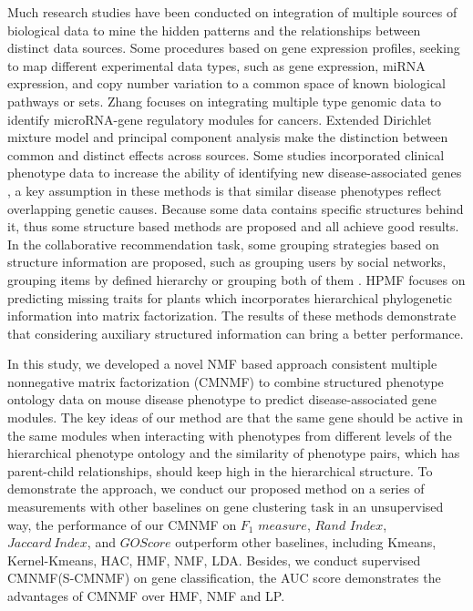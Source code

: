 \documentclass{bmcart}
\begin{document}
Much research studies have been conducted on integration of multiple sources of biological data to mine the hidden patterns and the relationships between distinct data sources. Some procedures based on gene expression profiles, seeking to map different experimental data types, such as gene expression, miRNA expression, and copy number variation to a common space of known biological pathways or sets\cite{Khatri2012,Mitrea2013}. Zhang\cite{Zhang2011} focuses on integrating multiple type genomic data to identify microRNA-gene regulatory modules for cancers. Extended Dirichlet mixture model\cite{Lock2013} and principal component analysis\cite{Lock2013a} make the distinction between common and distinct effects across sources. Some studies incorporated clinical phenotype data to increase the ability of identifying new disease-associated genes\cite{Hwang2012,Lage2007,Li2010,Vanunu2010,Wu2008a,Wu2008b}
, a key assumption in these methods is that similar disease phenotypes reflect overlapping genetic causes\cite{Houle2010}.
 Because some data contains specific structures behind it, thus some structure based methods are proposed and all achieve good results. In the collaborative recommendation task, some grouping strategies based on structure information are proposed, such as grouping users by social networks, grouping items by defined hierarchy or grouping both of them \cite{Wang2014,Ma2008,AliMashhoori2012}. HPMF\cite{Shan2012} focuses on predicting missing traits for plants which incorporates hierarchical phylogenetic information into matrix factorization. The results of these methods demonstrate that considering auxiliary structured information can bring a better performance.

In this study, we developed a novel NMF based approach consistent multiple nonnegative matrix factorization (CMNMF) to combine structured phenotype ontology data on mouse disease phenotype to predict disease-associated gene modules. The key ideas of our method are that the same gene should be active in the same modules when interacting with phenotypes from different levels of the hierarchical phenotype ontology  and the similarity of phenotype pairs, which has parent-child relationships, should keep high in the hierarchical structure. To demonstrate the approach, we conduct our proposed method on a series of measurements with other baselines on gene clustering task in an unsupervised way, the performance of our CMNMF on $F_1$ $measure$, $Rand$ $Index$, $Jaccard\ Index$, and $GO Score$ outperform other baselines, including Kmeans, Kernel-Kmeans, HAC, HMF\cite{AliMashhoori2012}, NMF\cite{Lee1999}, LDA\cite{Blei2003}. Besides, we conduct supervised CMNMF(S-CMNMF) on gene classification, the AUC score demonstrates the advantages of CMNMF over HMF, NMF and LP\cite{Raghavan2007}.
\end{document}

